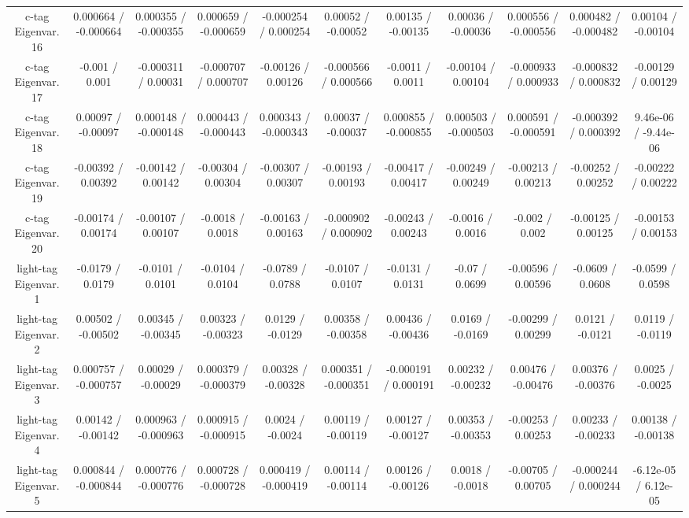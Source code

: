 \begin{table}[htbp]
\begin{center}
\begin{tabular}{|c|c|c|c|c|c|c|c|c|c|c|}
  c-tag Eigenvar. 16 & 0.000664 / -0.000664 & 0.000355 / -0.000355 & 0.000659 / -0.000659 & -0.000254 / 0.000254 & 0.00052 / -0.00052 & 0.00135 / -0.00135 & 0.00036 / -0.00036 & 0.000556 / -0.000556 & 0.000482 / -0.000482 & 0.00104 / -0.00104 \\ 
  c-tag Eigenvar. 17 & -0.001 / 0.001 & -0.000311 / 0.00031 & -0.000707 / 0.000707 & -0.00126 / 0.00126 & -0.000566 / 0.000566 & -0.0011 / 0.0011 & -0.00104 / 0.00104 & -0.000933 / 0.000933 & -0.000832 / 0.000832 & -0.00129 / 0.00129 \\ 
  c-tag Eigenvar. 18 & 0.00097 / -0.00097 & 0.000148 / -0.000148 & 0.000443 / -0.000443 & 0.000343 / -0.000343 & 0.00037 / -0.00037 & 0.000855 / -0.000855 & 0.000503 / -0.000503 & 0.000591 / -0.000591 & -0.000392 / 0.000392 & 9.46e-06 / -9.44e-06 \\ 
  c-tag Eigenvar. 19 & -0.00392 / 0.00392 & -0.00142 / 0.00142 & -0.00304 / 0.00304 & -0.00307 / 0.00307 & -0.00193 / 0.00193 & -0.00417 / 0.00417 & -0.00249 / 0.00249 & -0.00213 / 0.00213 & -0.00252 / 0.00252 & -0.00222 / 0.00222 \\ 
  c-tag Eigenvar. 20 & -0.00174 / 0.00174 & -0.00107 / 0.00107 & -0.0018 / 0.0018 & -0.00163 / 0.00163 & -0.000902 / 0.000902 & -0.00243 / 0.00243 & -0.0016 / 0.0016 & -0.002 / 0.002 & -0.00125 / 0.00125 & -0.00153 / 0.00153 \\ 
  light-tag Eigenvar. 1 & -0.0179 / 0.0179 & -0.0101 / 0.0101 & -0.0104 / 0.0104 & -0.0789 / 0.0788 & -0.0107 / 0.0107 & -0.0131 / 0.0131 & -0.07 / 0.0699 & -0.00596 / 0.00596 & -0.0609 / 0.0608 & -0.0599 / 0.0598 \\ 
  light-tag Eigenvar. 2 & 0.00502 / -0.00502 & 0.00345 / -0.00345 & 0.00323 / -0.00323 & 0.0129 / -0.0129 & 0.00358 / -0.00358 & 0.00436 / -0.00436 & 0.0169 / -0.0169 & -0.00299 / 0.00299 & 0.0121 / -0.0121 & 0.0119 / -0.0119 \\ 
  light-tag Eigenvar. 3 & 0.000757 / -0.000757 & 0.00029 / -0.00029 & 0.000379 / -0.000379 & 0.00328 / -0.00328 & 0.000351 / -0.000351 & -0.000191 / 0.000191 & 0.00232 / -0.00232 & 0.00476 / -0.00476 & 0.00376 / -0.00376 & 0.0025 / -0.0025 \\ 
  light-tag Eigenvar. 4 & 0.00142 / -0.00142 & 0.000963 / -0.000963 & 0.000915 / -0.000915 & 0.0024 / -0.0024 & 0.00119 / -0.00119 & 0.00127 / -0.00127 & 0.00353 / -0.00353 & -0.00253 / 0.00253 & 0.00233 / -0.00233 & 0.00138 / -0.00138 \\ 
  light-tag Eigenvar. 5 & 0.000844 / -0.000844 & 0.000776 / -0.000776 & 0.000728 / -0.000728 & 0.000419 / -0.000419 & 0.00114 / -0.00114 & 0.00126 / -0.00126 & 0.0018 / -0.0018 & -0.00705 / 0.00705 & -0.000244 / 0.000244 & -6.12e-05 / 6.12e-05 \\ 

\end{tabular}
\end{center}
\end{table}
